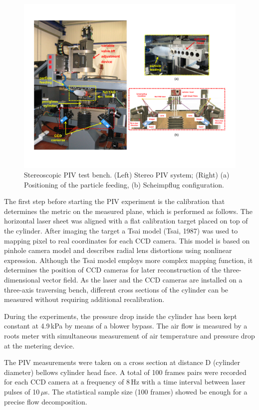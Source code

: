 \documentclass[12pt,a4paper]{article}
\begin{document}
\begin{figure}[h]
 \centering
 \includegraphics[width=1\textwidth]{./imgs/bench.pdf}
 \caption{Stereoscopic PIV test bench. (Left) Stereo PIV system; (Right) (a) Positioning of the particle feeding, (b) Scheimpflug configuration.}
 \label{fig: bench}
\end{figure}

The first step before starting the PIV experiment is the calibration that determines the metric on the measured plane, which is performed as follows. The horizontal laser sheet was aligned with a flat calibration target placed on top of the cylinder. After imaging the target a Tsai model (Tsai, 1987) was used to mapping pixel to real coordinates for each CCD camera. This model is based on pinhole camera model and describes radial lens distortions using nonlinear expression. Although the Tsai model employs more complex mapping function, it determines the position of CCD cameras for later reconstruction of the three-dimensional vector field. As the laser and the CCD cameras are installed on a three-axis traversing bench, different cross sections of the cylinder can be measured without requiring additional recalibration.

During the experiments, the pressure drop inside the cylinder has been kept constant at 4.9\,kPa by means of a blower bypass. The air flow is measured by a roots meter with simultaneous measurement of air temperature and pressure drop at the metering device.

The PIV measurements were taken on a cross section at distance D (cylinder diameter) bellows cylinder head face. A total of 100 frames pairs were recorded for each CCD camera at a frequency of 8\,Hz with a time interval between laser pulses of 10\,$\mu$s. The statistical sample size (100 frames) showed be enough for a precise flow decomposition. 
\end{document}
